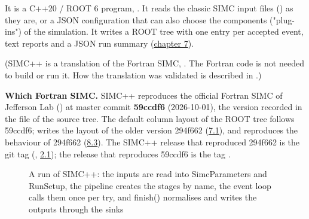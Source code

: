 It is a C++20 / ROOT 6 program, . It reads the classic SIMC input files () as they are, or a JSON
configuration that can also choose the components ("plug-ins") of the simulation. It writes a ROOT tree with one entry per
accepted event, text reports and a JSON run summary (\hyperref[user_manual-07u5foutputs]{chapter 7}).

(SIMC++ is a translation of the Fortran SIMC, . The Fortran code is not needed to build or run it. How the
translation was validated is described in .)

\textbf{Which Fortran SIMC.} SIMC++ reproduces the official Fortran SIMC of Jefferson Lab () at
master commit \textbf{59ccdf6} (2026-10-01),\allowbreak{} the version recorded in the file  of the source tree. The default
column layout of the ROOT tree follows 59ccdf6;  writes the layout of the older version 294f662
(\hyperref[user_manual-07u5foutputs]{7.1}), and  reproduces the behaviour of 294f662
(\hyperref[user_manual-08u5frunningu5fandu5freproducibility:83-default-and-legacy-compatible-mode]{8.3}). The SIMC++ release that reproduced
294f662 is the git tag  (, \hyperref[user_manual-02u5finstallation:21-directory-layout-used-in-this-manual]{2.1});
the release that reproduces 59ccdf6 is the tag .

\begin{figure}[htbp]
\caption[A run of SIMC++]{A run of SIMC++: the inputs are read into SimcParameters and RunSetup, the pipeline creates the stages by name, the event loop calls them once per try, and finish() normalises and writes the outputs through the sinks}\label{fig:runu5fflow}
\end{figure}
